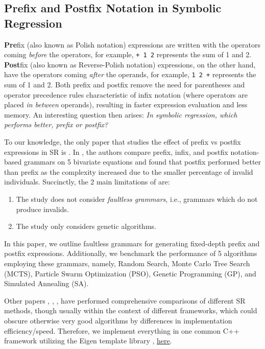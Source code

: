 \documentclass[runningheads]{llncs}
\begin{document}
\subsection{Prefix and Postfix Notation in Symbolic Regression}
\textbf{Pre}fix (also known as Polish notation) expressions are written with the operators coming \emph{before} the operators, for example, \texttt{+ 1 2} represents the sum of 1 and 2. \textbf{Post}fix (also known as Reverse-Polish notation) expressions, on the other hand, have the operators coming \emph{after} the operands, for example, \texttt{1 2 +} represents the sum of 1 and 2. Both prefix and postfix remove the need for parentheses and operator precedence rules characteristic of infix notation (where operators are placed \emph{in between} operands), resulting in faster expression evaluation and less memory. An interesting question then arises: \emph{In symbolic regression, which performs better, prefix or postfix?}
\par To our knowledge, the only paper that studies the effect of prefix vs postfix expressions in SR is \cite{hemberg2008pre}.  In \cite{hemberg2008pre}, the authors compare prefix, infix, and postfix notation-based grammars on 5 bivariate equations and found that postfix performed better than prefix as the complexity increased due to the smaller percentage of invalid individuals.  
Succinctly, the 2 main limitations of \cite{hemberg2008pre} are:
\begin{enumerate}
\item The study does not consider \emph{faultless grammars}, i.e., grammars which do not produce invalids.
\item The study only considers genetic algorithms.
\end{enumerate}
In this paper, we outline faultless grammars for generating fixed-depth prefix and postfix expressions. Additionally, we benchmark the performance of 5 algorithms employing these grammars, namely, Random Search, Monte Carlo Tree Search (MCTS), Particle Swarm Optimization (PSO), Genetic Programming (GP), and Simulated Annealing (SA). 
\par Other papers \cite{lacava2021contemporary}, \cite{10.1145/3205455.3205539}, \cite{Zegklitz2021}, have performed comprehensive comparisons of different SR methods, though usually within the context of different frameworks, which could obscure otherwise very good algorithms by differences in implementation efficiency/speed. Therefore, we implement everything in one common C++ framework utilizing the Eigen template library  \cite{eigenweb}, \href{https://github.com/edfink234/Alpha-Zero-Symbolic-Regression/tree/prefix_and_postfix_cpp_implementation}{here}.
\end{document}
